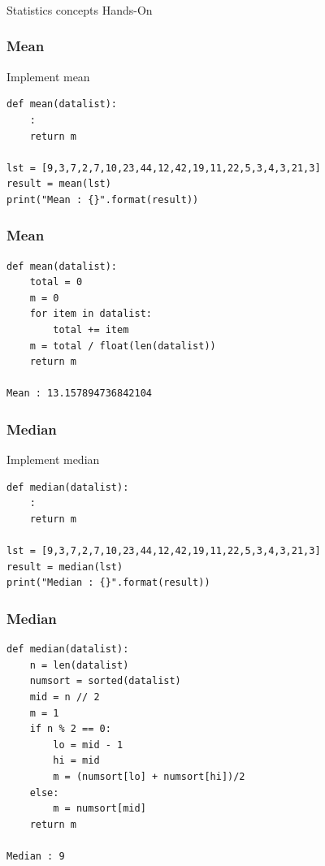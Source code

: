 \begin{frame}[fragile]\frametitle{}
\begin{center}
{\Large Statistics concepts Hands-On}
\end{center}
\end{frame}

\begin{frame}[fragile]\frametitle{Mean}
Implement mean
\begin{lstlisting}
def mean(datalist):
	:
	return m

lst = [9,3,7,2,7,10,23,44,12,42,19,11,22,5,3,4,3,21,3]
result = mean(lst)
print("Mean : {}".format(result))
\end{lstlisting}
\end{frame}

\begin{frame}[fragile]\frametitle{Mean}
\begin{lstlisting}
def mean(datalist):
	total = 0
	m = 0
	for item in datalist:
		total += item
	m = total / float(len(datalist))
	return m

Mean : 13.157894736842104
\end{lstlisting}
\end{frame}

\begin{frame}[fragile]\frametitle{Median}
Implement median
\begin{lstlisting}
def median(datalist):
	:
	return m

lst = [9,3,7,2,7,10,23,44,12,42,19,11,22,5,3,4,3,21,3]
result = median(lst)
print("Median : {}".format(result))
\end{lstlisting}
\end{frame}

\begin{frame}[fragile]\frametitle{Median}
\begin{lstlisting}
def median(datalist):
    n = len(datalist)
    numsort = sorted(datalist)
    mid = n // 2
    m = 1
    if n % 2 == 0:
        lo = mid - 1
        hi = mid
        m = (numsort[lo] + numsort[hi])/2
    else:
        m = numsort[mid]
    return m

Median : 9
\end{lstlisting}
\end{frame}



